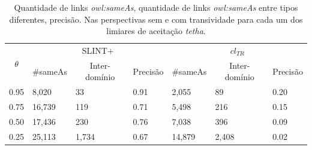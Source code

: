 \begin{table}[h]
	\centering
	\caption{Quantidade de links \textit{owl:sameAs}, quantidade de links \textit{owl:sameAs} entre tipos diferentes, precisão. Nas perspectivas sem e com transividade para cada um dos limiares de aceitação \textit{tetha}.}
	\label{tab:homoceanu2014putting}
	\begin{tabular}{@{}l|lll|lll@{}}
		\toprule
		\multicolumn{1}{c|}{\multirow{2}{*}{$\theta$}} & \multicolumn{3}{c|}{SLINT+}                                                                      & \multicolumn{3}{c}{$cl_{TR}$}                                                                  \\
		\multicolumn{1}{c|}{}                        & \multicolumn{1}{c}{\#sameAs} & \multicolumn{1}{c}{Inter-domínio} & \multicolumn{1}{c|}{Precisão} & \multicolumn{1}{c}{\#sameAs} & \multicolumn{1}{c}{Inter-domínio} & \multicolumn{1}{c}{Precisão} \\ \midrule
		0.95                                         & 8,020                        & 33                                & 0.91                          & 2,055                        & 89                                & 0.20                         \\
		0.75                                         & 16,739                       & 119                               & 0.71                          & 5,498                        & 216                               & 0.15                         \\
		0.50                                         & 17,436                       & 230                               & 0.76                          & 7,038                        & 396                               & 0.09                         \\
		0.25                                         & 25,113                       & 1,734                             & 0.67                          & 14,879                       & 2,408                             & 0.02                         \\ \bottomrule
	\end{tabular}
\end{table}




